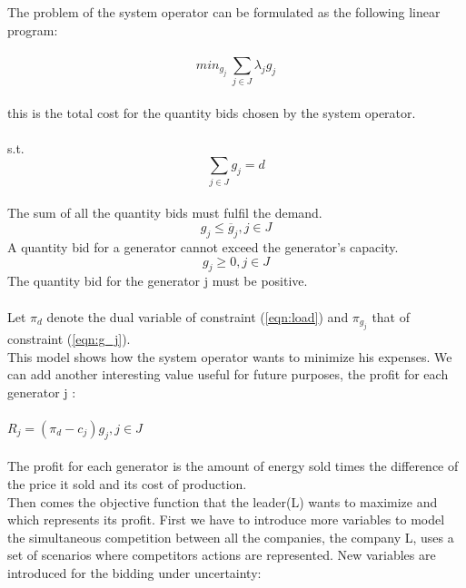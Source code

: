 \documentclass[letterpaper]{article}
\begin{document}
The problem of the system operator can be formulated as the following linear program:\\ \\
\begin{equation}
min_{g_j} \ \sum_{j \in J} \lambda_j g_j
\end{equation}\\
this is the total cost for the quantity bids chosen by the system operator.\\ \\
s.t.
\begin{equation}
\sum_{j \in J} g_j = d  \label{eqn:load}
\end{equation}\\
The sum of all the quantity bids must fulfil the demand.\\
\begin{equation}
g_j \leq \overline{g}_j, j \in J \label{eqn:g_j}
\end{equation}
A quantity bid for a generator cannot exceed the generator's capacity.\\ 
\begin{equation}
g_j \geq 0, j\in J
\end{equation}
The quantity bid for the generator j must be positive.\\ \\
Let $\pi_d$ denote the dual variable of constraint (\ref{eqn:load}) and $\pi_{g_j}$ that of constraint (\ref{eqn:g_j}).\\
This model shows how the system operator wants to minimize his expenses.
We can add another interesting value useful for future purposes, the profit for each generator j :\\ \\
$R_j = (\pi_d - c_j)g_j, j \in J$ \\ \\
The profit for each generator is the amount of energy sold times the difference of the price it sold and its cost of production. \\ 
Then comes the objective function that the leader(L) wants to maximize and which represents its profit. First we have to introduce more variables to model the simultaneous competition between all the companies, the company L, uses a set of scenarios where competitors actions are represented. New variables are introduced for the bidding under uncertainty: \\ \\
\end{document}
